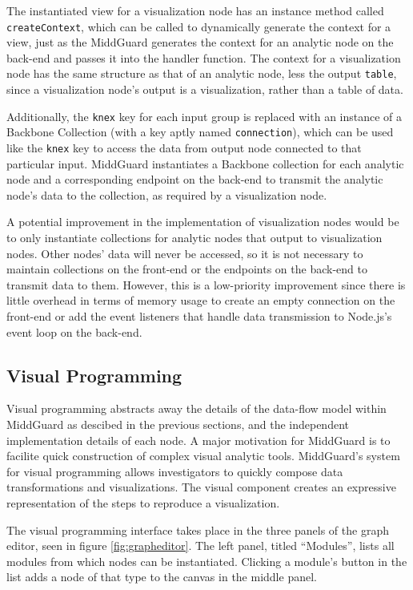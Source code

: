 \documentclass[midd]{thesis}
\begin{document}
The instantiated view for a visualization node has an instance method called
\texttt{createContext}, which can be called to dynamically generate the context
for a view, just as the MiddGuard generates the context for an analytic node on
the back-end and passes it into the handler function. The context for a
visualization node has the same structure as that of an analytic node, less the
output \texttt{table}, since a visualization node's output is a visualization,
rather than a table of data.

Additionally, the \texttt{knex} key for each input group is replaced with an
instance of a Backbone Collection (with a key aptly named \texttt{connection}),
which can be used like the \texttt{knex} key to access the data from output node
connected to that particular input. MiddGuard instantiates a Backbone collection
for each analytic node and a corresponding endpoint on the back-end to transmit
the analytic node's data to the collection, as required by a visualization node.

A potential improvement in the implementation of visualization nodes would be to
only instantiate collections for analytic nodes that output to visualization
nodes. Other nodes' data will never be accessed, so it is not necessary to
maintain collections on the front-end or the endpoints on the back-end to
transmit data to them. However, this is a low-priority improvement since there
is little overhead in terms of memory usage to create an empty connection on the
front-end or add the event listeners that handle data transmission to Node.js's
event loop on the back-end.

\subsection{Visual Programming}

Visual programming abstracts away the details of the data-flow model within
MiddGuard as descibed in the previous sections, and the independent
implementation details of each node. A major motivation for MiddGuard is to
facilite quick construction of complex visual analytic tools. MiddGuard's system
for visual programming allows investigators to quickly compose data
transformations and visualizations. The visual component creates an expressive
representation of the steps to reproduce a visualization.

The visual programming interface takes place in the three panels of the graph
editor, seen in figure \ref{fig:grapheditor}. The left panel, titled
``Modules'', lists all modules from which nodes can be instantiated. Clicking a
module's button in the list adds a node of that type to the canvas in the middle
panel.
\end{document}
